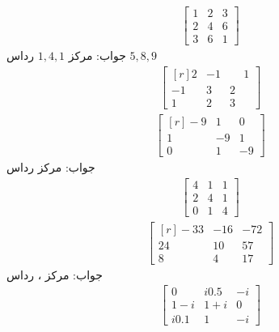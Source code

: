 \begin{align*}
\begin{bmatrix}1&2&3\\ 2&4&6\\3&6&1  \end{bmatrix}
\end{align*}
جواب:\quad
مرکز
$1,4,1$
رداس
$5,8,9$
\quad
\begin{align*}
\begin{bmatrix*}[r]2&-1&\phantom{-}1\\-1&3&2\\1&2&3  \end{bmatrix*}
\end{align*}
\begin{align*}
\begin{bmatrix*}[r]-9&1&0\\ 1&-9&1\\0&1&-9 \end{bmatrix*}
\end{align*}
جواب:\quad
مرکز  رداس 
\quad
\begin{align*}
\begin{bmatrix} 4&1&1\\ 2&4&1\\0&1&4 \end{bmatrix}
\end{align*}
\begin{align*}
\begin{bmatrix*}[r]-33&-16&-72\\ 24&10&57\\8&4&17  \end{bmatrix*}
\end{align*}
جواب:\quad
مرکز ، رداس 
\begin{align*}
\begin{bmatrix} 0&i0.5&-i\\ 1-i&1+i&0\\i0.1&1&-i \end{bmatrix}
\end{align*}
\quad

